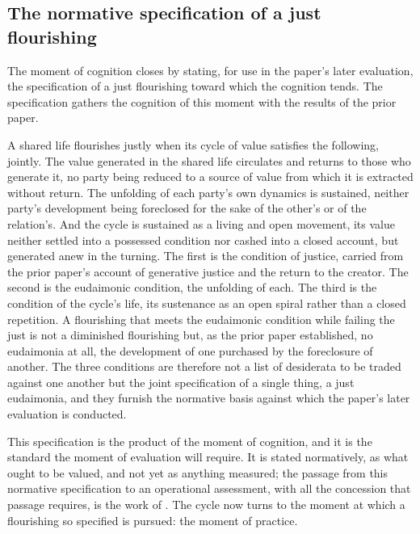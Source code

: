 \subsection{The normative specification of a just flourishing}
\label{p11:sec:cog-spec}

The moment of cognition closes by stating, for use in the paper's later evaluation, the specification of a just flourishing toward which the cognition tends. The specification gathers the cognition of this moment with the results of the prior paper.

\begin{claim}
A shared life flourishes justly when its cycle of value satisfies the following, jointly. The value generated in the shared life circulates and returns to those who generate it, no party being reduced to a source of value from which it is extracted without return. The unfolding of each party's own dynamics is sustained, neither party's development being foreclosed for the sake of the other's or of the relation's. And the cycle is sustained as a living and open movement, its value neither settled into a possessed condition nor cashed into a closed account, but generated anew in the turning. The first is the condition of justice, carried from the prior paper's account of generative justice and the return to the creator. The second is the eudaimonic condition, the unfolding of each. The third is the condition of the cycle's life, its sustenance as an open spiral rather than a closed repetition. A flourishing that meets the eudaimonic condition while failing the just is not a diminished flourishing but, as the prior paper established, no eudaimonia at all, the development of one purchased by the foreclosure of another. The three conditions are therefore not a list of desiderata to be traded against one another but the joint specification of a single thing, a just eudaimonia, and they furnish the normative basis against which the paper's later evaluation is conducted.
\end{claim}

\noindent
This specification is the product of the moment of cognition, and it is the standard the moment of evaluation will require. It is stated normatively, as what ought to be valued, and not yet as anything measured; the passage from this normative specification to an operational assessment, with all the concession that passage requires, is the work of . The cycle now turns to the moment at which a flourishing so specified is pursued: the moment of practice.
